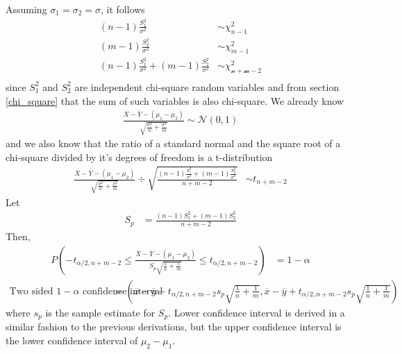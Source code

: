 \documentclass[../probability-notes.tex]{subfiles}
\begin{document}
    Assuming $\sigma_{1} = \sigma_{2} = \sigma$, it follows
    \begin{align*}
        (n-1)\frac{S_{1}^{2}}{\sigma^{2}} &\sim \chi_{n-1}^{2}\\
        (m-1)\frac{S_{2}^{2}}{\sigma^{2}} &\sim \chi_{m-1}^{2}\\
        (n-1)\frac{S_{1}^{2}}{\sigma^{2}} + (m-1)\frac{S_{2}^{2}}{\sigma^{2}} &\sim \mathcal{\chi_{n+m-2}^{2}}\\
    \end{align*}
    since $S_{1}^{2}$ and $S_{2}^{2}$ are independent chi-square random variables and from section \ref{chi_square} that the sum of such variables is also chi-square.\newline
    We already know
    \begin{align*}
        \frac{\overline{X} - \overline{Y} - (\mu_{1} - \mu_{2})}{\sqrt{\frac{\sigma^{2}}{n} + \frac{\sigma^{2}}{m}}} \sim \mathcal{N}(0, 1)
    \end{align*}
    and we also know that the ratio of a standard normal and the square root of a chi-square divided by it's degrees of freedom is a t-distribution
    \begin{align*}
        \frac{\overline{X} - \overline{Y} - (\mu_{1} - \mu_{2})}{\sqrt{\frac{\sigma^{2}}{n} + \frac{\sigma^{2}}{m}}} \div \sqrt{\frac{(n-1)\frac{S_{1}^{2}}{\sigma^{2}} + (m-1)\frac{S_{2}^{2}}{\sigma^{2}}}{n+m-2}} &\sim t_{n+m-2}
    \end{align*}
    Let
    \begin{align*}
        S_{p} &= \frac{(n-1)S_{1}^{2} + (m-1)S_{2}^{2}}{n + m - 2}
    \end{align*}
    Then,
    \begin{align*}
        P(-t_{\alpha/2, n+m-2} \leq \frac{\overline{X} - \overline{Y} - (\mu_{1} - \mu_{2})}{S_{p}\sqrt{\frac{1}{n} + \frac{1}{m}}} \leq t_{\alpha/2, n+m-2}) &= 1 - \alpha
    \end{align*}
    \begin{align*}
        \text{Two sided $1 - \alpha$ confidence interval} &= (\overline{x} - \overline{y}-t_{\alpha /2, n+m-2}s_{p}\sqrt{\frac{1}{n} + \frac{1}{m}}, \overline{x} - \overline{y}+t_{\alpha /2, n+m-2}s_{p}\sqrt{\frac{1}{n} + \frac{1}{m}})
    \end{align*}
    where $s_{p}$ is the sample estimate for $S_{p}$. Lower confidence interval is derived in a similar fashion to the previous derivations, but the upper confidence interval is the lower confidence interval of $\mu_{2} - \mu_{1}$.
\end{document}
